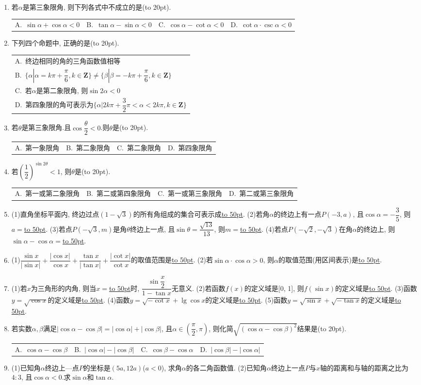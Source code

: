 \documentclass[10pt,a4paper]{article}
\newcommand{\blank}[1]{\underline{\hbox to #1pt{}}}
\newcommand{\bracket}[1]{(\hbox to #1pt{})}
\newcommand{\onech}[4]{\par\begin{tabular}{p{.9\textwidth}}
A.~#1\\
B.~#2\\
C.~#3\\
D.~#4
\end{tabular}}
\newcommand{\fourch}[4]{\par\begin{tabular}{p{.23\textwidth}p{.23\textwidth}p{.23\textwidth}p{.23\textwidth}}
A.~#1 &B.~#2& C.~#3& D.~#4
\end{tabular}}
\begin{document}
\begin{enumerate}[1.]
\item 若$\alpha$是第三象限角, 则下列各式中不成立的是\bracket{20}.
\fourch{$\sin \alpha +\cos \alpha <0$}{$\tan \alpha -\sin \alpha <0$}{$\cos \alpha -\cot \alpha <0$}{$\cot \alpha \cdot \csc \alpha <0$}
\item 下列四个命题中, 正确的是\bracket{20}.
\onech{终边相同的角的三角函数值相等}{$\{\alpha|\alpha =k\pi +\dfrac{\pi }6,k\in \mathbf{Z}\}\ne \{\beta|\beta =-k\pi +\dfrac{\pi }6,k\in \mathbf{Z}\}$}{若$\alpha$是第二象限角, 则$\sin 2\alpha <0$}{第四象限的角可表示为$\{\alpha|2k\pi +\dfrac 32\pi <\alpha <2k\pi ,k\in \mathbf{Z}\}$}
\item 若$\theta$是第三象限角.且$\cos \dfrac{\theta }2<0$.则$\theta$是\bracket{20}.
\fourch{第一象限角}{第二象限角}{第二象限角}{第四象限角}
\item 若$(\dfrac 12)^{\sin 2\theta }<1$, 则$\theta$是\bracket{20}.
\fourch{第一或第二象限角}{第二或第四象限角}{第一或第三象限角}{第二或第三象限角}
\item (1)直角坐标平面内, 终边过点$(1-\sqrt 3)$的所有角组成的集合可表示成\blank{50}.
(2)若角$\alpha$的终边上有一点$P(-3,a)$, 且$\cos \alpha =-\dfrac 35$, 则$a=$\blank{50}.
(3)若点$P(-\sqrt 3,m)$是角$\theta$终边上一点, 且$\sin \theta =\dfrac{\sqrt {13}}{13}$, 则$m=$\blank{50}.
(4)若点$P(-\sqrt 2,-\sqrt 3)$在角$\alpha$的终边上, 则$\sin \alpha -\cos \alpha =$\blank{50}.
\item (1)$\dfrac{\sin x}{|\sin x|}+\dfrac{|\cos x|}{\cos x}+\dfrac{\tan x}{|\tan x|}+\dfrac{|\cot x|}{\cot x}$的取值范围是\blank{50}.
(2)若$\sin \alpha \cdot \cos \alpha >0$, 则$\alpha$的取值范围(用区间表示)是\blank{50}.
\item (1)若$x$为三角形的内角, 则当$x=$\blank{50}时, $\dfrac{\sin \dfrac x2}{1-\tan x}$无意义.
(2)若函数$f(x)$的定义域是[0, 1], 则$f(\sin x)$的定义域是\blank{50}.
(3)函数$y=\sqrt {\cos x}$的定义域是\blank{50}.
(4)函数$y=\sqrt {-\cot x}+\lg \cos x$的定义域是\blank{50}.
(5)函数$y=\sqrt {\sin x}+\sqrt {-\tan x}$的定义域是\blank{50}.
\item 若实数$\alpha ,\beta$满足$|\cos \alpha -\cos \beta|=|\cos \alpha|+|\cos \beta|$, 且$\alpha \in (\dfrac{\pi }2,\pi)$, 则化简$\sqrt {(\cos \alpha -\cos \beta)^2}$结果是\bracket{20}.
\fourch{$\cos \alpha -\cos \beta$}{$|\cos \alpha|-|\cos \beta|$}{$\cos \beta -\cos \alpha$}{$|\cos \beta|-|\cos \alpha|$}
\item (1)已知角$\alpha$终边上—点$P$的坐标是$(5a,12a)$($a<0$), 求角$\alpha$的各二角函数值.
(2)已知角$\alpha$终边上一点$P$与$x$轴的距离和与轴的距离之比为$4:3$, 且$\cos \alpha <0$.求$\sin \alpha$和$\tan \alpha$.

\end{enumerate}
\end{document}
